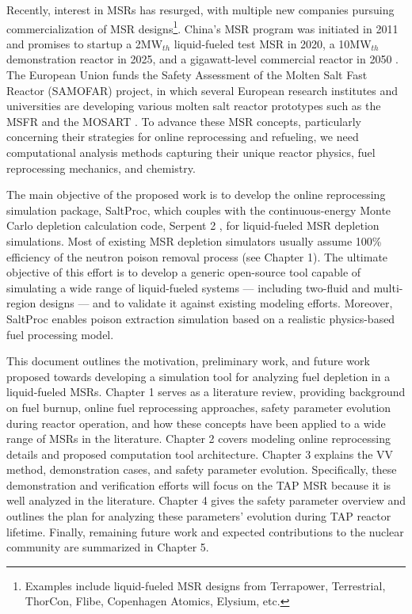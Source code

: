 Recently, interest in \glspl{MSR} has resurged, with multiple new companies 
pursuing commercialization of \gls{MSR} designs\footnote{Examples 
include liquid-fueled \gls{MSR} designs from Terrapower, Terrestrial, 
ThorCon, Flibe, Copenhagen Atomics, Elysium, etc.}. China's \gls{MSR} program 
was initiated in 2011 and promises to startup a 2MW$_{th}$ 
liquid-fueled test \gls{MSR} in 2020, a 10MW$_{th}$ 
demonstration reactor in 2025, and a gigawatt-level 
commercial reactor in 2050 \cite{zhang_review_2018}. The European 
Union funds the Safety Assessment of the Molten Salt Fast Reactor 
(SAMOFAR) project, in which several European research institutes and 
universities are developing various molten salt reactor prototypes 
such as the \gls{MSFR} \cite{fiorina_molten_2013} and the \gls{MOSART} 
\cite{ignatiev_molten_2014}. To advance these \gls{MSR} concepts, particularly 
concerning their strategies for online reprocessing and refueling, 
we need computational analysis methods capturing their unique reactor physics, 
fuel reprocessing mechanics, and chemistry. 

The main objective of the proposed work is to develop the online 
reprocessing simulation package, SaltProc, which couples with the 
continuous-energy Monte Carlo depletion calculation code, Serpent 2 
\cite{leppanen_serpent_2014}, for liquid-fueled \gls{MSR} depletion 
simulations. Most of existing \gls{MSR} depletion simulators usually assume 100\% 
efficiency of the neutron poison removal process (see Chapter 1). The ultimate 
objective of this effort is to develop a generic open-source tool capable of 
simulating a wide range of liquid-fueled systems --- including two-fluid and
multi-region designs --- and to validate it against existing modeling efforts. 
Moreover, SaltProc enables poison extraction simulation based on a 
realistic physics-based fuel processing model.

This document outlines the motivation, preliminary work, and future work 
proposed towards developing a simulation tool for analyzing fuel depletion in 
a liquid-fueled \glspl{MSR}. Chapter 1 serves as a literature review, 
providing background on fuel burnup, online fuel reprocessing approaches, 
safety parameter evolution during reactor operation, and how these 
concepts have been applied to a wide range of \glspl{MSR} in the literature. 
Chapter 2 covers modeling online reprocessing details and proposed computation 
tool architecture. Chapter 3 explains the \gls{VV} method, demonstration 
cases, and safety parameter evolution. Specifically, these demonstration and 
verification efforts will focus on the \gls{TAP} \gls{MSR} because it is well 
analyzed in the literature. Chapter 4 gives the safety parameter overview and 
outlines the plan for analyzing these parameters' evolution during \gls{TAP} 
reactor lifetime. Finally, remaining future work and expected contributions to 
the nuclear community are summarized in Chapter 5.

